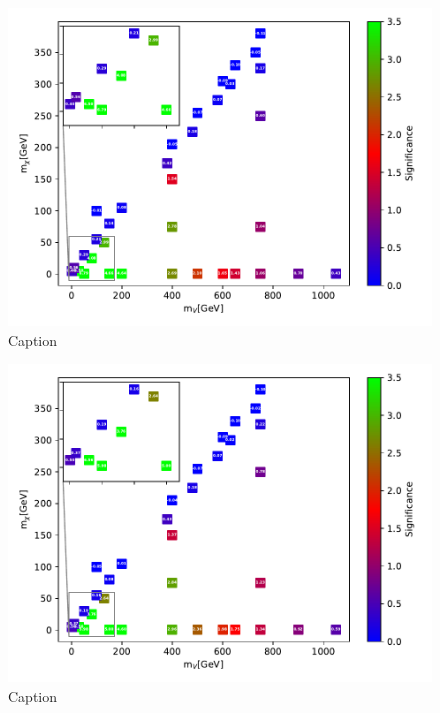 \begin{figure}
    \centering
    \includegraphics[width = \textwidth]{Figures/Significances/significance_NN_monoZ_Low_level.pdf}
    \caption{Caption}
    \label{fig:my_label}
\end{figure}


\begin{figure}
    \centering
    \includegraphics[width = \textwidth]{Figures/Significances/significance_NN_monoZ_High_level.pdf}
    \caption{Caption}
    \label{fig:my_label}
\end{figure}



